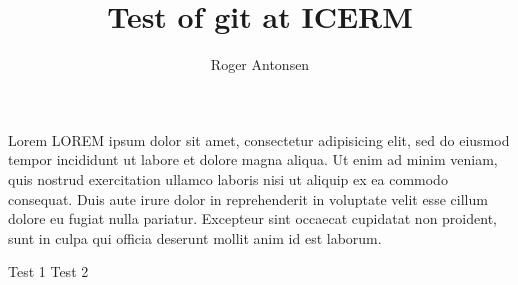 \documentclass[12pt,a4paper]{article}
\author{Roger Antonsen}
\title{Test of git at ICERM}
\begin{document}
\maketitle

Lorem LOREM ipsum dolor sit amet, consectetur adipisicing elit, sed do eiusmod tempor incididunt ut labore et dolore magna aliqua. Ut enim ad minim veniam, quis nostrud exercitation ullamco laboris nisi ut aliquip ex ea commodo consequat. Duis aute irure dolor in reprehenderit in voluptate velit esse cillum dolore eu fugiat nulla pariatur. Excepteur sint occaecat cupidatat non proident, sunt in culpa qui officia deserunt mollit anim id est laborum.

Test 1
Test 2
\end{document}
